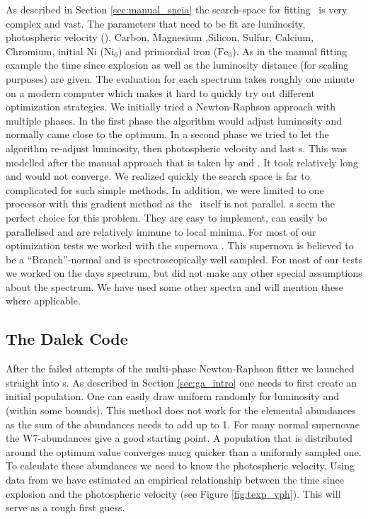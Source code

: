 As described in Section \ref{sec:manual_sneia} the search-space for fitting \sneia\ is very complex and vast. The parameters that need to be fit are luminosity, photospheric velocity (\vph), Carbon, Magnesium ,Silicon, Sulfur, Calcium, Chromium, initial Ni ($\textrm{Ni}_0$) and primordial iron ($\textrm{Fe}_0$). As in the manual fitting example the time since explosion as well as the luminosity distance (for scaling purposes) are given. The evaluation for each spectrum takes roughly one minute on a modern computer which makes it hard to quickly try out different optimization strategies. We initially tried a Newton-Raphson approach with multiple phases. In the first phase the algorithm would adjust luminosity and normally came close to the optimum. In a second phase we tried to let the algorithm re-adjust luminosity, then photospheric velocity and last \ige s. This was modelled after the manual approach that is taken by \citet{hachinger_dipl2007} and \citep{hachinger_phd2011}. It took relatively long and would not converge. We realized quickly the search space is far to complicated for such simple methods. In addition, we were limited to one processor with this gradient method as the \mlc\ itself is not parallel. \ga s seem the perfect choice for this problem. They are easy to implement, can easily be parallelised and are relatively immune to local minima. 
For most of our optimization tests we worked with the supernova  \citep{2004MNRAS.348..261B}. This supernova is believed to be a ``Branch''-normal and is spectroscopically well sampled. For most of our tests we worked on the  days spectrum, but did not make any other special assumptions about the spectrum. We have used some other spectra and will mention these where applicable.

\subsection{The Dalek Code}

After the failed attempts of the multi-phase Newton-Raphson fitter we launched straight into \ga s. As described in Section \ref{sec:ga_intro} one needs to first create an initial population. One can easily draw uniform randomly for luminosity and \vph (within some bounds). This method does not work for the elemental abundances as the sum of the abundances needs to add up to 1. For many normal supernovae the W7-abundances  \citep{1984ApJ...286..644N} give a good starting point. A population that is distributed around the optimum value converges mucg quicker than a uniformly sampled one. To calculate these abundances we need to know the photospheric velocity. Using data from \citet{2005ApJ...623.1011B} we have estimated an empirical relationship between the time since explosion and the photospheric velocity (see Figure \ref{fig:texp_vph}). This will serve as a rough first guess.

